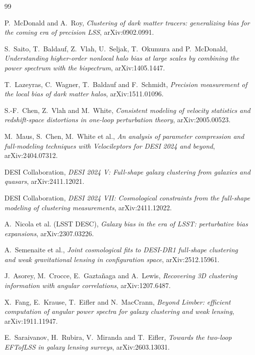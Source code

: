 \documentclass[11pt]{article}
\begin{document}
\begin{thebibliography}{99}

P.~McDonald and A.~Roy,
\emph{Clustering of dark matter tracers: generalizing bias for the
coming era of precision LSS},
arXiv:0902.0991.

S.~Saito, T.~Baldauf, Z.~Vlah, U.~Seljak, T.~Okumura and
P.~McDonald,
\emph{Understanding higher-order nonlocal halo bias at large scales by
combining the power spectrum with the bispectrum},
arXiv:1405.1447.

T.~Lazeyras, C.~Wagner, T.~Baldauf and F.~Schmidt,
\emph{Precision measurement of the local bias of dark matter halos},
arXiv:1511.01096.

S.-F.~Chen, Z.~Vlah and M.~White,
\emph{Consistent modeling of velocity statistics and redshift-space
distortions in one-loop perturbation theory},
arXiv:2005.00523.

M.~Maus, S.~Chen, M.~White et al.,
\emph{An analysis of parameter compression and full-modeling
techniques with Velocileptors for DESI 2024 and beyond},
arXiv:2404.07312.

DESI Collaboration,
\emph{DESI 2024 V: Full-shape galaxy clustering from galaxies and
quasars},
arXiv:2411.12021.

DESI Collaboration,
\emph{DESI 2024 VII: Cosmological constraints from the full-shape
modeling of clustering measurements},
arXiv:2411.12022.

A.~Nicola et al. (LSST DESC),
\emph{Galaxy bias in the era of LSST: perturbative bias expansions},
arXiv:2307.03226.

A.~Semenaite et al.,
\emph{Joint cosmological fits to DESI-DR1 full-shape clustering and
weak gravitational lensing in configuration space},
arXiv:2512.15961.

J.~Asorey, M.~Crocce, E.~Gazta\~naga and A.~Lewis,
\emph{Recovering 3D clustering information with angular correlations},
arXiv:1207.6487.

X.~Fang, E.~Krause, T.~Eifler and N.~MacCrann,
\emph{Beyond Limber: efficient computation of angular power spectra
for galaxy clustering and weak lensing},
arXiv:1911.11947.

E.~Saraivanov, H.~Rubira, V.~Miranda and T.~Eifler,
\emph{Towards the two-loop EFTofLSS in galaxy lensing surveys},
arXiv:2603.13031.

\end{thebibliography}
\end{document}
